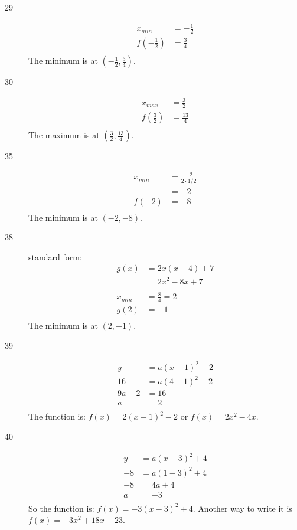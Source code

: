 \documentclass{exam}
\begin{document}
\begin{description}
    \item[29]
      \begin{align*}
        x_{min}                       &= - \frac{1}{2} \\
        f\left( - \frac{1}{2} \right) &= \frac{3}{4} \\
      \end{align*}
      The minimum is at $\left( - \frac{1}{2}, \frac{3}{4} \right)$.

    \item[30]
      \begin{align*}
        x_{max}                     &= \frac{3}{2} \\
        f\left( \frac{3}{2} \right) &= \frac{13}{4} \\
      \end{align*}
      The maximum is at $\left( \frac{3}{2}, \frac{13}{4} \right)$.

    \item[35]
      \begin{align*}
        x_{min} &= \frac{-2}{2 \cdot 1/2} \\
                &= -2 \\
        f(-2)   &= -8 \\
      \end{align*}
      The minimum is at $(-2, -8)$.

    \item[38]
      standard form:
      \begin{align*}
        g(x)    &= 2x(x - 4) + 7 \\
                &= 2x^2 - 8x + 7 \\
        \\
        x_{min} &= \frac{8}{4} = 2 \\
        g(2)    &= -1 \\
      \end{align*}
      The minimum is at $(2, -1)$.

    \item[39]
      \begin{align*}
        y      &= a(x - 1)^2 - 2 \\
        16     &= a(4 - 1)^2 - 2 \\
        9a - 2 &= 16 \\
        a      &= 2 \\
      \end{align*}
      The function is: $f(x) = 2(x - 1)^2 - 2$ or $f(x) = 2x^2 - 4x$.

    \item[40]
      \begin{align*}
        y  &= a(x - 3)^2 + 4 \\
        -8 &= a(1 - 3)^2 + 4 \\
        -8 &= 4a + 4 \\
        a  &= -3 \\
      \end{align*}
      So the function is: $f(x) = -3(x - 3)^2 + 4$.  Another way to write it is $f(x) = -3x^2 + 18x - 23$.


\end{description}
\end{document}
